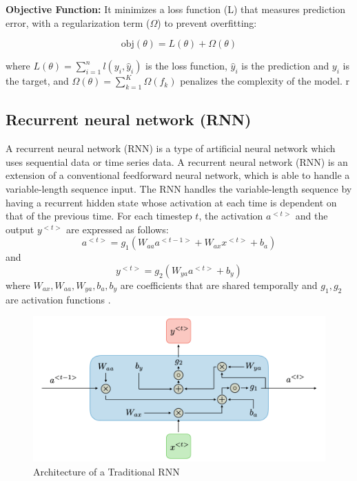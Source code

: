 \documentclass{ieeeojies}
\begin{document}
\textbf{Objective Function:}
It minimizes a loss function (L) that measures prediction error, with a regularization term ($\Omega$) to prevent overfitting:\cite{geekXGboost}

\begin{equation*}
\text{obj}(\theta) = L(\theta) + \Omega(\theta)
\end{equation*}

where \( L(\theta) = \sum_{i=1}^n l(y_i, \hat{y}_i) \) is the loss function, \(\hat{y}_i\) is the prediction and \( y_i \) is the target, and \( \Omega(\theta) = \sum_{k=1}^K \Omega(f_k) \) penalizes the complexity of the model.
r\\
\subsection{Recurrent neural network (RNN)}
A recurrent neural network (RNN) is a type of artificial neural network which uses sequential data or time series data\cite{IBM}.  A recurrent neural network (RNN) is an extension of a conventional feedforward neural network, which is able to handle a variable-length sequence input. The RNN handles the variable-length sequence by having a recurrent hidden state whose activation at each time is dependent on that of the previous time\cite{Chung}.
For each timestep \( t \), the activation \( a^{<t>} \) and the output \( y^{<t>} \) are expressed as follows:
\[
a^{<t>} = g_1\left( W_{aa} a^{<t-1>} + W_{ax} x^{<t>} + b_a \right)
\]
and
\[
y^{<t>} = g_2\left( W_{ya} a^{<t>} + b_y \right)
\]
where \( W_{ax}, W_{aa}, W_{ya}, b_a, b_y \) are coefficients that are shared temporally and \( g_1, g_2 \) are activation functions \cite{standford}.

\begin{figure}[H]
    \centering
\begin{minipage}{0.5\textwidth}
        \centering
        \includegraphics[width=\textwidth]{bibliography/Figure/RNNmodel.png}
        \caption{Architecture of a Traditional RNN}
        \label{fig:3}
\end{minipage}
\end{figure}
\end{document}
